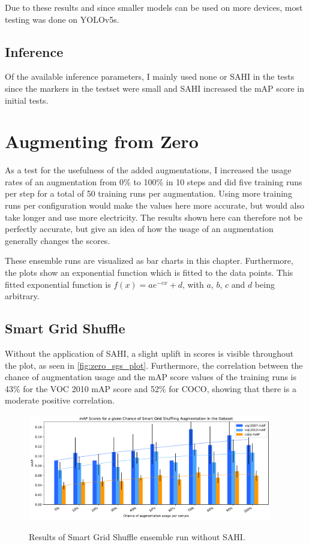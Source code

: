 \documentclass[10pt]{book}
\newcommand{\figureref}[1]{\autoref{#1}}
\begin{document}
Due to these results and since smaller models can be used on more devices, most testing was done on \ac{YOLO}v5s.

\subsection{Inference}

Of the available inference parameters, I mainly used none or \ac{SAHI} in the tests since the markers in the testset were small and \ac{SAHI} increased the \ac{mAP} score in initial tests.

\section{Augmenting from Zero} %
\label{sec:aug_ens_zero}

As a test for the usefulness of the added augmentations, I increased the usage rates of an augmentation from 0\% to 100\% in 10 steps and did five training runs per step for a total of 50 training runs per augmentation. Using more training runs per configuration would make the values here more accurate, but would also take longer and use more electricity. The results shown here can therefore not be perfectly accurate, but give an idea of how the usage of an augmentation generally changes the scores. 

These ensemble runs are visualized as bar charts in this chapter. Furthermore, the plots show an exponential function which is fitted to the data points. This fitted exponential function is $f(x)=a\mathit{e}^{-cx}+d$, with $a$, $b$, $c$ and $d$ being arbitrary.

\subsection{Smart Grid Shuffle}

Without the application of \ac{SAHI}, a slight uplift in scores is visible throughout the plot, as seen in \figureref{fig:zero_sgs_plot}. Furthermore, the correlation between the chance of augmentation usage and the \ac{mAP} score values of the training runs is 43\% for the VOC 2010 \ac{mAP} score and 52\% for \ac{COCO}, showing that there is a moderate positive correlation.

\begin{figure}
  \caption{Results of Smart Grid Shuffle ensemble run without \ac{SAHI}.}
  \includegraphics[width=0.95\textwidth]{image/zero-based-sgs-ensemble-2-thesis}
  \label{fig:zero_sgs_plot}
\end{figure}
\end{document}
